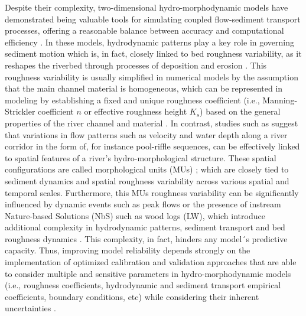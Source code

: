 \documentclass[draft,linenumbers,onecolumn]{agujournal2019} %
\begin{document}
Despite their complexity, two-dimensional hydro-morphodynamic models have demonstrated being valuable tools for simulating coupled flow-sediment transport processes, offering a reasonable balance between accuracy and computational efficiency \cite{papanicolaou2008sediment}. In these models, hydrodynamic patterns play a key role in governing sediment motion which is, in fact, closely linked to bed roughness variability, as it reshapes the riverbed through processes of deposition and erosion \cite{lokin2023effect,mishra2020alluvial}. This roughness variability is usually simplified in numerical models by the assumption that the main channel material is homogeneous, which can be represented in modeling by establishing a fixed and unique roughness coefficient (i.e., Manning-Strickler coefficient \( n \) or effective roughness height \( K_s \)) based on the general properties of the river channel and material \cite{chow1959openchannel}. In contrast, studies such as  suggest that variations in flow patterns such as velocity and water depth along a river corridor in the form of, for instance pool-riffle sequences, can be effectively linked to spatial features of a river’s hydro-morphological structure. These spatial configurations are called morphological units (MUs) \cite{wadeson1994geomorphological,wyrick2014geospatial}; which are closely tied to sediment dynamics and spatial roughness variability across various spatial and temporal scales. Furthermore, this MUs roughness variability can be significantly influenced by dynamic events such as peak flows or the presence of instream Nature-based Solutions (NbS) such as wood logs (LW), which introduce additional complexity in hydrodynamic patterns, sediment transport and bed roughness dynamics \cite{bunte2001samplinga,schalko2024flow}.  This complexity, in fact, hinders any model´s predictive capacity. Thus, improving model reliability depends strongly on the implementation of optimized calibration and validation approaches that are able to consider multiple and sensitive parameters in hydro-morphodynamic models (i.e., roughness coefficients, hydrodynamic and sediment transport empirical coefficients, boundary conditions, etc) while considering their inherent uncertainties \cite{guerrero2012calibration,li2011twodimensional,bel2020calibration,scolari2025hydromorphodynamic}.
\end{document}
